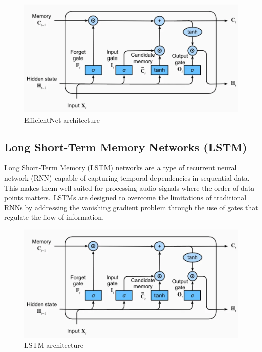 \begin{figure}[h!]
    \centering
    \includegraphics[scale=0.4]{images/LSTM.png}
    \caption{EfficientNet architecture}%
\end{figure}

\subsection{Long Short-Term Memory Networks (LSTM)}

Long Short-Term Memory (LSTM) networks are a type of recurrent neural network
(RNN) capable of capturing temporal dependencies in sequential data. This makes
them well-suited for processing audio signals where the order of data points
matters. LSTMs are designed to overcome the limitations of traditional RNNs by
addressing the vanishing gradient problem through the use of gates that
regulate the flow of information.

\begin{figure}[h!]
    \centering
    \includegraphics[scale=0.4]{images/LSTM.png}
    \caption{LSTM architecture}%
\end{figure}

